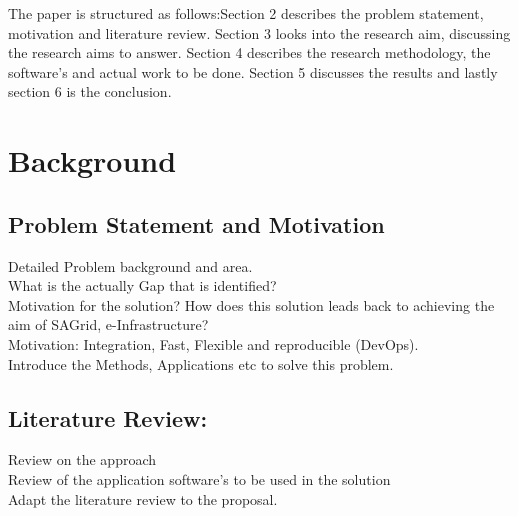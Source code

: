 \documentclass [titlepage,11pt]{article}
\begin{document}
The paper is structured as follows:Section 2 describes the problem statement, motivation and literature review. Section 3 looks into the research aim, discussing the research aims to answer. Section 4 describes the research methodology, the software's and actual work to be done. Section 5 discusses the results and lastly section 6 is the conclusion. \\


\section{Background}

\subsection{Problem Statement and Motivation}

Detailed Problem background and area. \\
What is the actually Gap that is identified? \\
Motivation for the solution? How does this solution leads back to achieving the aim of SAGrid, e-Infrastructure? \\
Motivation: Integration, Fast, Flexible and reproducible (DevOps). \\
Introduce the Methods, Applications etc to solve this problem. \\

\subsection{Literature Review: }
Review on the approach \\
Review of the application software's to be used in the solution \\
Adapt the literature review to the proposal. \\
\end{document}
